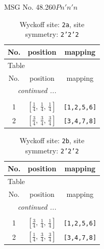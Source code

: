 \documentclass[fleqn,8pt]{jsarticle}
\begin{document}
\setcounter{MaxMatrixCols}{32}

\renewcommand{\tablename}{Table~}
\renewcommand{\figurename}{Figure~}
\begin{center}
\LARGE
MSG No. 48.260\quad$Pn'n'n$
\end{center}
\renewcommand{\arraystretch}{1.2}
\begin{longtable}{ccc}
\caption{Wyckoff site: {\tt 2a}, site symmetry: {\tt 2'2'2}}
 \\
 \hline \hline
No. & position & mapping \\ \hline \endfirsthead

\multicolumn{2}{l}{\tablename\ \thetable{}} \\
 \hline \hline
No. & position & mapping \\ \hline \endhead

 \hline \hline
\multicolumn{2}{r}{\footnotesize\it continued ...} \\ \endfoot

 \hline \hline
\multicolumn{2}{r}{} \\ \endlastfoot

1 & $\left[ \frac{1}{4},\, \frac{1}{4},\, \frac{1}{4} \right]$ & {\tt [1,2,5,6]} \\ \hline
2 & $\left[ \frac{3}{4},\, \frac{3}{4},\, \frac{3}{4} \right]$ & {\tt [3,4,7,8]} \\
\end{longtable}
\renewcommand{\arraystretch}{1.2}
\begin{longtable}{ccc}
\caption{Wyckoff site: {\tt 2b}, site symmetry: {\tt 2'2'2}}
 \\
 \hline \hline
No. & position & mapping \\ \hline \endfirsthead

\multicolumn{2}{l}{\tablename\ \thetable{}} \\
 \hline \hline
No. & position & mapping \\ \hline \endhead

 \hline \hline
\multicolumn{2}{r}{\footnotesize\it continued ...} \\ \endfoot

 \hline \hline
\multicolumn{2}{r}{} \\ \endlastfoot

1 & $\left[ \frac{3}{4},\, \frac{1}{4},\, \frac{1}{4} \right]$ & {\tt [1,2,5,6]} \\ \hline
2 & $\left[ \frac{1}{4},\, \frac{3}{4},\, \frac{3}{4} \right]$ & {\tt [3,4,7,8]} \\
\end{longtable}
\end{document}
